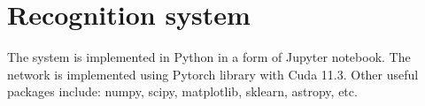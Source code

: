\section{Recognition system}




The system is implemented in Python in a form of Jupyter notebook. The network is implemented using Pytorch library with Cuda 11.3. Other useful packages include: numpy, scipy, matplotlib, sklearn, astropy, etc. 




